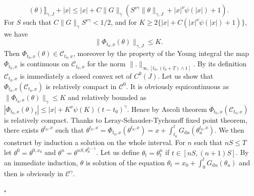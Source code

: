 \documentclass[a4paper,11pt]{article}
\newcommand{\mathd}{\mathrm{d}}
\newenvironment{proof}{{\sc Proof.}}{\hfill$\square$}
\newcommand{\CC}{\mathscr C}
\begin{document}
\begin{proof}
\[     ( \theta ) \rrbracket_{\gamma ,J} + | x | \leqslant | x | +C
     \|G\|_{\gamma} (S^{\nu \gamma} \| \theta \|_{\gamma ,J} +|x|^{\nu} \psi (
     | x | ) +1) . \]
  For $S$ such that $C \| G \|_{\gamma} S^{\nu \gamma} <1/2$, and for $K
  \geqslant 2 \{ | x | +C ( |x|^{\nu} \psi ( | x | ) +1 ) \}$, we have
  \[ \| \Phi_{t_{0} ,x} ( \theta ) \|_{\gamma ,J} \leqslant K. \]
  Then $\Phi_{t_{0} ,x} ( \theta ) \in \mathcal{C}_{t_{0} ,x}$, moreover by
  the property of the Young integral the map $\Phi_{t_{0} ,x}$ is continuous
  on $\mathcal{C}_{t_{0} ,x}$ for the norm $\|.\|_{\infty , [t_{0} ,(t_{0} +T)
  \wedge 1]}$. By its definition $\mathcal{C}_{t_{0} ,x}$ is immediately a
  closed convex set of $C^{0} ( J )$. Let us show that $\Phi_{t_{0} ,x} (
  \mathcal{C}_{t_{0} ,x} )$ is relatively compact in $\mathcal{C}^{0}$. It is
  obviously equicontinuous as $\| \Phi_{t_{0} ,x} ( \theta )\|_{\gamma}
  \leqslant K$ and relatively bounded as $| \Phi_{t_{0} ,x} ( \theta )_{t} |
  \leqslant |x| +K^{\nu} \psi ( K ) (t-t_{0} )^{\gamma}$. Hence by Ascoli
  theorem $\Phi_{t_{0} ,x} ( \mathcal{C}_{t_{0} ,x} )$ is relatively compact.
  Thanks to Leray-Schauder-Tychonoff fixed point theorem, there exists
  $\theta^{t_{0} ,x}$ such that $\theta^{t_{0} ,x} = \Phi_{t_{0} ,x} (
  \theta^{t_{0} ,x} ) =x+ \int_{t_{0}}^{t} G_{\mathd u} ( \theta^{t_{0}
  ,x}_{u} )$. We then construct by induction a solution on the whole interval.
  For $n$ such that $n S \leqslant T$ let $\theta^{0} = \theta^{0,x_{0}}$ and
  $\theta^{n} = \theta^{nS, \theta^{n-1}_{S}}$. Let us define $\theta_{t} =
  \theta^{n}_{t}$ if $t \in [nS,(n+1)S]$. By an immediate induction, $\theta$
  is solution of the equation $\theta_{t} =x_{0} + \int_{0}^{t} G_{\mathd u} (
  \theta_{u} )$ and then is obviously in $\CC^{\gamma}$.
  

\end{proof}
\end{document}
